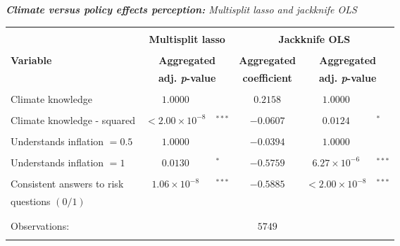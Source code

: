 \documentclass[a4paper,12pt]{article}
\begin{document}
{\centering
\begin{threeparttable}
\caption{\small{\textit{\textbf{Climate versus policy effects perception:} Multisplit lasso and jackknife OLS}}}
\label{Climpol435} 
\centering
\begin{small}
\begin{tabular}{lclccl} 
\hline \vspace{-0.2cm} \\
  \multicolumn{1}{l}{} & \multicolumn{2}{c}{\large{\textbf{Multisplit lasso}}}& \multicolumn{3}{c}{\large{\textbf{Jackknife OLS}}}  \\
  
\vspace{-0.2cm} \\
  \multicolumn{1}{l}{\vspace{0.1cm}\textbf{Variable}} & \multicolumn{2}{c}{\textbf{Aggregated}}& \multicolumn{1}{c}{\textbf{Aggregated}} &  \multicolumn{2}{c}{\textbf{Aggregated}} \\
    \multicolumn{1}{l}{ } & \multicolumn{2}{c}{\textbf{adj. \textit{p}-value}}& \multicolumn{1}{c}{\textbf{coefficient}} &  \multicolumn{2}{c}{\textbf{adj. \textit{p}-value}} \\
 \hline 
\hline
\\
\vspace{-0.2cm}Climate knowledge&$1.0000$& &$0.2158$&$1.0000$&\\
  \\
\vspace{-0.2cm}Climate knowledge - squared&$<2.00\times 10^{-8}$&$^{***}$&$-0.0607$&$0.0124$&$^{*}$\\
  \\
\vspace{-0.2cm}Understands inflation $=0.5$&$1.0000$& &$-0.0394$&$1.0000$& \\
  \\
\vspace{-0.2cm}Understands inflation $=1$&$0.0130$&$^{*}$&$-0.5759$&$6.27\times 10^{-6}$&$^{***}$\\
    \\
  Consistent answers to risk&\multirow{2}{*}{$1.06\times 10^{-8}$}&\multirow{2}{*}{$^{***}$}&\multirow{2}{*}{$-0.5885$}&\multirow{2}{*}{$<2.00\times 10^{-8}$}&\multirow{2}{*}{$^{***}$}\\
\hspace{0.6cm}questions $(0/1)$&& &&&\\
\\
\hline
\vspace{-0.4cm} \\ Observations:&    \multicolumn{5}{c}{$5749$} \\  \vspace{-0.4cm}

\end{tabular}
\end{small}
\end{threeparttable}}
\end{document}
